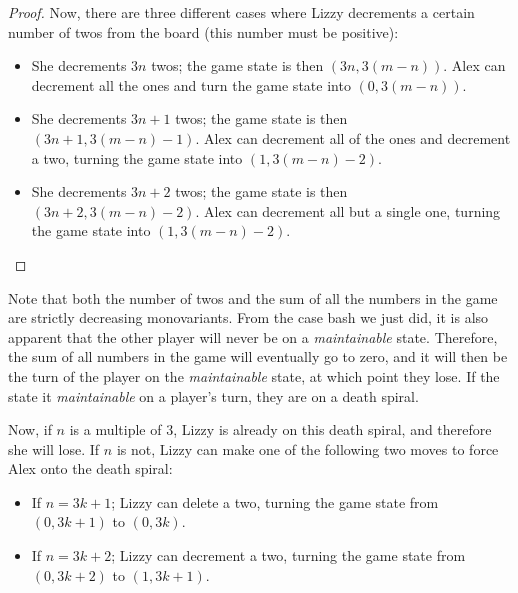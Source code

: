 \documentclass[10pt]{../usamts}
\begin{document}
\begin{solution}
\begin{proof}
    Now, there are three different cases where Lizzy decrements a certain number of twos from the board (this number must be positive):
    \begin{itemize}
        \item She decrements $3n$ twos; the game state is then $(3n, 3(m-n))$. Alex can decrement all the ones and turn the game state into $(0, 3(m-n))$.
        \item She decrements $3n+1$ twos; the game state is then $(3n+1, 3(m-n)-1)$. Alex can decrement all of the ones and decrement a two, turning the game state into $(1, 3(m-n)-2)$.
        \item She decrements $3n+2$ twos; the game state is then $(3n+2, 3(m-n)-2)$. Alex can decrement all but a single one, turning the game state into $(1, 3(m-n)-2)$.
    \end{itemize}
\end{proof}

Note that both the number of twos and the sum of all the numbers in the game are strictly decreasing monovariants. From the case bash we just did, it is also apparent that the other player will never be on a \textit{maintainable} state. Therefore, the sum of all numbers in the game will eventually go to zero, and it will then be the turn of the player on the \textit{maintainable} state, at which point they lose. If the state it \textit{maintainable} on a player's turn, they are on a death spiral.

Now, if $n$ is a multiple of 3, Lizzy is already on this death spiral, and therefore she will lose. If $n$ is not, Lizzy can make one of the following two moves to force Alex onto the death spiral:

\begin{itemize}
    \item If $n = 3k+1$; Lizzy can delete a two, turning the game state from $(0, 3k+1)$ to $(0, 3k)$.
    \item If $n = 3k+2$; Lizzy can decrement a two, turning the game state from $(0,3k+2)$ to $(1,3k+1)$.
\end{itemize}

\end{solution}
\end{document}
